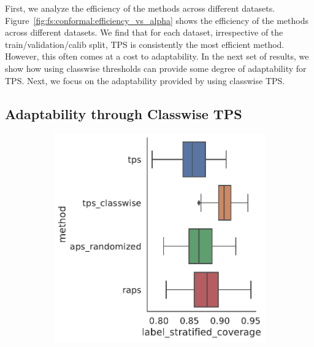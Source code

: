 First, we analyze the efficiency of the methods across different datasets.
Figure~\ref{fig:fs:conformal:efficiency_vs_alpha} shows the efficiency of the methods across different datasets.
We find that for each dataset, irrespective of the train/validation/calib split, TPS is consistently the most efficient method.
However, this often comes at a cost to adaptability.
In the next set of results, we show how using classwise thresholds can provide some degree of adaptability for TPS.
Next, we focus on the adaptability provided by using classwise TPS.

\subsection{Adaptability through Classwise TPS}
\begin{figure}
    \centering
    \begin{subfigure}{0.48\linewidth}
    \includegraphics[width=\linewidth,alt={Box plots for method comparison on CiteSeer dataset label stratified coverage.}]{graphConformal/figures/split/citeseer_label_stratified_coverage}
    \end{subfigure}
    \begin{subfigure}{0.48\linewidth}

\end{subfigure}
\end{figure}
